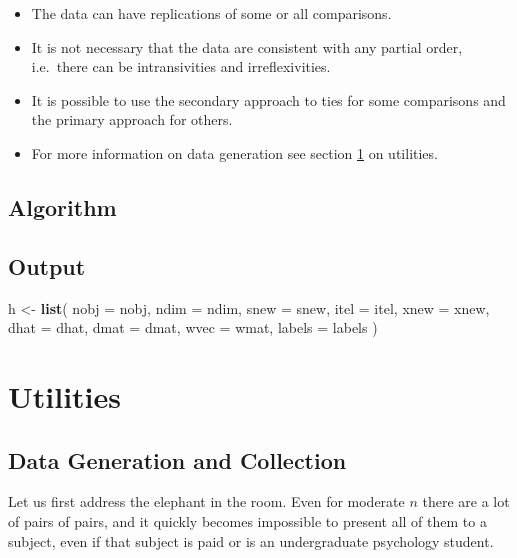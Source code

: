 \documentclass[
  12pt,
]{article}
\newenvironment{Shaded}{\begin{snugshade}}{\end{snugshade}}
\newcommand{\AttributeTok}[1]{\textcolor[rgb]{0.13,0.29,0.53}{#1}}
\newcommand{\FunctionTok}[1]{\textcolor[rgb]{0.13,0.29,0.53}{\textbf{#1}}}
\newcommand{\NormalTok}[1]{#1}
\newcommand{\OtherTok}[1]{\textcolor[rgb]{0.56,0.35,0.01}{#1}}
\providecommand{\tightlist}{%
  \setlength{\itemsep}{0pt}\setlength{\parskip}{0pt}}
\begin{document}
\begin{itemize}
\tightlist
\item
  The data can have replications of some or all comparisons.
\item
  It is not necessary that the data are consistent with any partial order, i.e.~there can be intransivities and irreflexivities.
\item
  It is possible to use the secondary approach to ties for some comparisons
  and the primary approach for others.
\item
  For more information on data generation see section \ref{utilities} on utilities.
\end{itemize}

\subsection{Algorithm}\label{algorithm}

\subsection{Output}\label{output}

\begin{Shaded}
\begin{Highlighting}[]
\NormalTok{  h }\OtherTok{\textless{}{-}} \FunctionTok{list}\NormalTok{(}
    \AttributeTok{nobj =}\NormalTok{ nobj,}
    \AttributeTok{ndim =}\NormalTok{ ndim,}
    \AttributeTok{snew =}\NormalTok{ snew,}
    \AttributeTok{itel =}\NormalTok{ itel,}
    \AttributeTok{xnew =}\NormalTok{ xnew,}
    \AttributeTok{dhat =}\NormalTok{ dhat,}
    \AttributeTok{dmat =}\NormalTok{ dmat,}
    \AttributeTok{wvec =}\NormalTok{ wmat,}
    \AttributeTok{labels =}\NormalTok{ labels}
\NormalTok{  )}
\end{Highlighting}
\end{Shaded}

\section{Utilities}\label{utilities}

\subsection{Data Generation and Collection}\label{data-generation-and-collection}

Let us first address the elephant in the room. Even for moderate \(n\) there are a
lot of pairs of pairs, and it quickly becomes impossible to present all of them to
a subject, even if that subject is paid or is an undergraduate psychology student.
\end{document}

